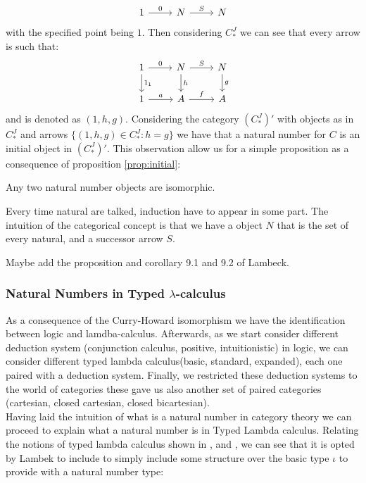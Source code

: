 \begin{definition}
\[
  \begin{tikzcd}
    1\arrow{r}{0} & N\arrow{r}{S} & N
  \end{tikzcd}
\]
with the specified point being $1$. Then considering $C_*^J$ we can see that every arrow is such that: 
\[
  \begin{tikzcd}
    1\arrow{r}{0}\arrow{d}{1_1} & N\arrow{r}{S}\arrow{d}{h} & N\arrow{d}{g}\\
    1\arrow{r}{a} & A\arrow{r}{f} & A
  \end{tikzcd}
\]
and is denoted as $(1,h,g)$. Considering the category $(C_*^J)'$ with objects as in $C_*^J$ and arrows  $\{(1,h,g)\in C_*^J: h=g\}$ we have that a natural number for $C$ is an initial object in $(C_*^J)'$. This observation allow us for a simple proposition as a consequence of proposition \ref{prop:initial}:

\begin{proposition}
  Any two natural number objects are isomorphic.
\end{proposition}

Every time natural are talked, induction have to appear in some part. The intuition of the categorical concept is that we have a object $N$ that is the set of every natural, and a successor arrow $S$. 

{\color{red} Maybe add the proposition and corollary 9.1 and 9.2 of Lambeck.}


\subsubsection{Natural Numbers in Typed $\lambda$-calculus}

As a consequence of the Curry-Howard isomorphism we have the identification between logic and lamdba-calculus. Afterwards, as we start consider different deduction system  (conjunction calculus, positive, intuitionistic) in logic, we can consider different typed lambda calculus(basic, standard, expanded), each one paired with a deduction system. Finally, we restricted these deduction systems to the world of categories these gave us also another set of paired categories (cartesian, closed cartesian, closed bicartesian).\\

Having laid the intuition of what is a natural number in category theory we can proceed to explain what a natural number is in Typed Lambda calculus. Relating the notions of typed lambda calculus shown in \cite[Section 10]{lambek1988introduction}, \cite[Section 6]{selinger2008lecture} and \cite[Section 10]{cardone2006history}, we can see that it is opted by Lambek to include to simply include some structure over the basic type $\iota$ to provide with a natural number type:


\end{definition}
